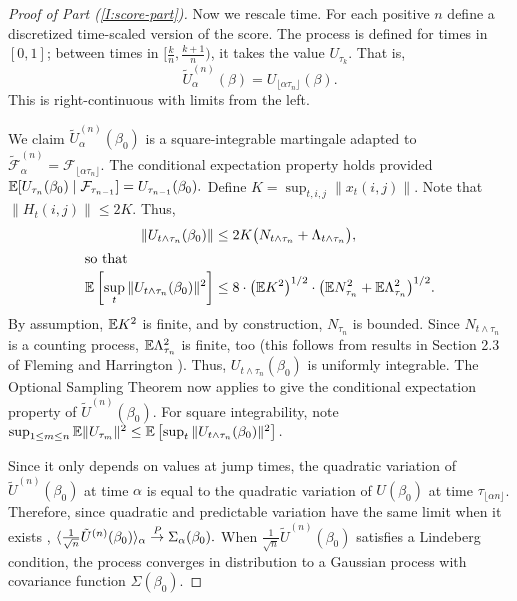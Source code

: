 \documentclass[aoas,preprint]{imsart}
\begin{document}
\begin{proof}[Proof of Part \textit{(\ref{I:score-part})}]
Now we rescale time.
For each positive $n$ define a discretized time-scaled version of the score.  
The process is defined for times in $[0,1]$; between times in
$[\tfrac{k}{n}, \tfrac{k+1}{n})$, it takes the value $U_{\tau_k}$.  That is,
\[
    \tilde U_{\alpha}^{(n)}(\beta)
        = U_{\lfloor \alpha \tau_n \rfloor}(\beta).
\]
This is right-continuous with limits from the left.

We claim $\tilde U_\alpha^{(n)}(\beta_0)$ is a square-integrable martingale
adapted to
\(
    \mathcal{\tilde F}^{(n)}_\alpha
        =
        \mathcal{F}_{\lfloor \alpha \tau_n \rfloor}.
\)
The conditional expectation property holds provided
\(
    \mathbb{E}[ U_{\tau_{n}}(\beta_0) \mid \mathcal{F}_{\tau_{n-1}} ]
        = U_{\tau_{n-1}}(\beta_0).
\)
Define $K = \sup_{t,i,j} \| x_{t}(i,j) \|$.
Note that $\|H_{t}(i,j)\| \leq 2 K$.  Thus,
\begin{align*}
    \| U_{t \wedge \tau_n} (\beta_0) \|
        &\leq
            2 K
            \big(
                N_{t \wedge \tau_n}
                +
                \Lambda_{t \wedge \tau_n}
            \big), \\
\intertext{so that}
    \E \left[
        \sup_t
        \| U_{t \wedge \tau_n} (\beta_0) \|^2
    \right]
        &\leq
            8 \cdot \big(\E K^2\big)^{1/2} \cdot
            \big(
              \E N_{\tau_n}^2
              +
              \E \Lambda_{\tau_n}^2              
            \big)^{1/2}.
\end{align*}
By assumption, $\mathbb{E} K^2$ is finite, and by construction, $N_{\tau_n}$ is
bounded.  Since $N_{t \wedge \tau_n}$ is a counting process,
$\mathbb{E} \Lambda_{\tau_n}^2$ is finite, too
(this follows from results in Section 2.3 of Fleming and Harrington
\cite{fleming1991counting}).  Thus, $U_{t \wedge \tau_n}(\beta_0)$
is uniformly integrable.  The Optional Sampling Theorem now applies to
give the conditional expectation property of $\tilde U^{(n)}(\beta_0)$.  For
square integrability, note
\(
    \sup_{1 \leq m \leq n}
    \mathbb{E} \| U_{\tau_m} \|^2
        \leq
        \mathbb{E} \left[
           \sup_t
           \| U_{t \wedge \tau_n} (\beta_0) \|^2
        \right].
\)

Since it only depends on values at jump times, the
quadratic variation of $\tilde U^{(n)}(\beta_0)$ at time $\alpha$ is
equal to the quadratic variation of $U(\beta_0)$ at time
$\tau_{\lfloor \alpha n \rfloor}$.  Therefore, since quadratic and predictable
variation have the same limit when it exists
\cite[Prop. 1]{rebolledo1980central},
\(
    \langle \frac{1}{\sqrt{n}} \tilde U^{(n)}(\beta_0) \rangle_\alpha
        \overset{\mathit{P}}{\to}
            \Sigma_\alpha(\beta_0).
\)
When $\frac{1}{\sqrt{n}} \tilde U^{(n)}(\beta_0)$ satisfies a Lindeberg condition,
the process converges in distribution to a Gaussian process with covariance
function $\Sigma(\beta_0).$


\end{proof}
\end{document}
